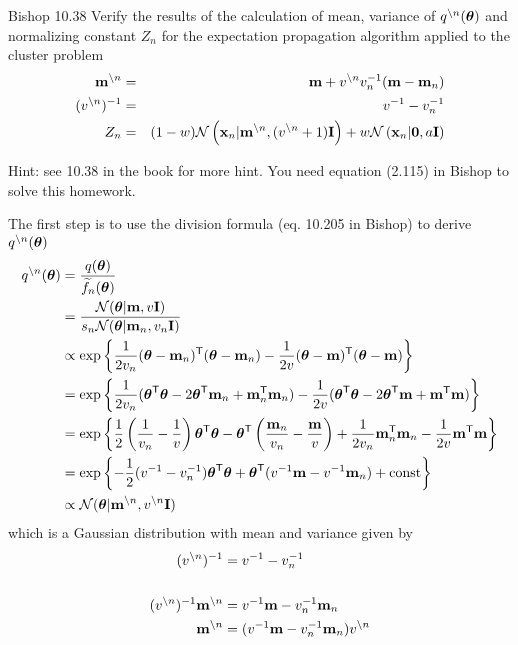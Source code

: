\documentclass{amsmlaj}
\begin{document}
\begin{extraproblem}\textsf{Bishop 10.38}
Verify the results of the calculation of mean, variance of $q^{\backslash n}(\bm{\mathbf{\theta}})$ and normalizing constant $Z_n$ for the expectation propagation algorithm applied to the cluster problem
\begin{eqnarray}
\bm{\mathbf{m}}^{\backslash n} & = & \bm{\mathbf{m}} + v^{\backslash n}v_n^{-1}(\bm{\mathbf{m}}-\bm{\mathbf{m}}_n)\\
(v^{\backslash n})^{-1} & = & v^{-1} - v_n^{-1}\\
Z_n & = & (1-w)\mathcal{N}\left(\bm{\mathbf{x}}_n|\bm{\mathbf{m}}^{\backslash n}, (v^{\backslash n}+1)\bm{\mathbf{I}}\right) + w\mathcal{N}\left(\bm{\mathbf{x}}_n|\bm{\mathbf{0}},a\bm{\mathbf{I}}\right)
\end{eqnarray}

Hint: see 10.38 in the book for more hint. You need equation (2.115) in Bishop to solve this homework.

\begin{sol}
	The first step is to use the division formula (eq. 10.205 in Bishop) to derive
	$q^{\setminus n}(\bm{\mathbf{\theta}})$
	\begin{align}
		q^{\setminus n}(\bm{\mathbf{\theta}})
		&=\frac{q(\bm{\mathbf{\theta}})}{\widetilde{f}_n(\bm{\mathbf{\theta}})} \\
		&=\frac{\mathcal{N}(\bm{\mathbf{\theta}}|\bm{\mathbf{m}},v\bm{\mathbf{I}})}{s_n\mathcal{N}(\bm{\mathbf{\theta}}|\bm{\mathbf{m}}_n,v_n\bm{\mathbf{I}})} \\
		&\propto \exp \left\{
			\frac{1}{2v_n}(\bm{\mathbf{\theta}}-\bm{\mathbf{m}}_n)^{\mathsf{T}}(\bm{\mathbf{\theta}}-\bm{\mathbf{m}}_n)
			-\frac{1}{2v}(\bm{\mathbf{\theta}}-\bm{\mathbf{m}})^{\mathsf{T}}(\bm{\mathbf{\theta}}-\bm{\mathbf{m}})
		\right\} \\
		&= \exp \left\{
			\frac{1}{2v_n}(\bm{\mathbf{\theta}}^{\mathsf{T}}\bm{\mathbf{\theta}}-2\bm{\mathbf{\theta}}^{\mathsf{T}}\bm{\mathbf{m}}_n+\bm{\mathbf{m}}_n^{\mathsf{T}}\bm{\mathbf{m}}_n)
			-\frac{1}{2v}(\bm{\mathbf{\theta}}^{\mathsf{T}}\bm{\mathbf{\theta}}-2\bm{\mathbf{\theta}}^{\mathsf{T}}\bm{\mathbf{m}}+\bm{\mathbf{m}}^{\mathsf{T}}\bm{\mathbf{m}})
		\right\} \\
		&= \exp \left\{
			\frac{1}{2}\left(\frac{1}{v_n}-\frac{1}{v}\right)\bm{\mathbf{\theta}}^{\mathsf{T}}\bm{\mathbf{\theta}}
			-\bm{\mathbf{\theta}}^{\mathsf{T}}\left( \frac{\bm{\mathbf{m}}_n}{v_n}-\frac{\bm{\mathbf{m}}}{v} \right)
			+\frac{1}{2v_n}\bm{\mathbf{m}}_n^{\mathsf{T}}\bm{\mathbf{m}}_n
			-\frac{1}{2v}\bm{\mathbf{m}}^{\mathsf{T}}\bm{\mathbf{m}}
		\right\} \\
		&= \exp \left\{
			-\frac{1}{2}(v^{-1}-v_n^{-1})\bm{\mathbf{\theta}}^{\mathsf{T}}\bm{\mathbf{\theta}}
			+\bm{\mathbf{\theta}}^{\mathsf{T}}(v^{-1}\bm{\mathbf{m}}-v^{-1}\bm{\mathbf{m}}_n)
			+ \text{const}
		\right\} \\
		&\propto \mathcal{N}(\bm{\mathbf{\theta}}|\bm{\mathbf{m}}^{\setminus n},v^{\setminus n}\bm{\mathbf{I}})
	\end{align}
	which is a Gaussian distribution with mean and variance given by
	\begin{align}
		(v^{\setminus n})^{-1}&=v^{-1}-v_n^{-1} \\
		&\nonumber\\
		(v^{\setminus n})^{-1}\bm{\mathbf{m}}^{\setminus n}
		&=v^{-1}\bm{\mathbf{m}}-v_n^{-1}\bm{\mathbf{m}}_n \\
		\bm{\mathbf{m}}^{\setminus n}
		&=(v^{-1}\bm{\mathbf{m}}-v_n^{-1}\bm{\mathbf{m}}_n) v^{\setminus n}
	\end{align}
\end{sol}

\end{extraproblem}
\end{document}
